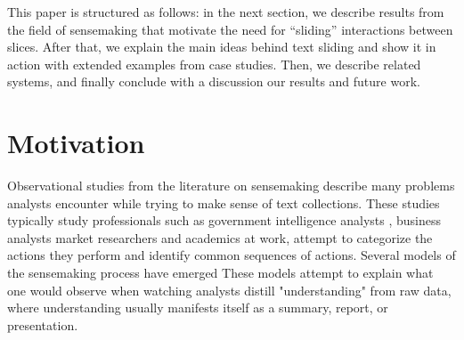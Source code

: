 \documentclass{sig-alternate}
\begin{document}
This paper is structured as follows: in the next section, we describe results from the field of sensemaking that motivate the need for ``sliding'' interactions between slices. After that, we explain the main ideas behind text sliding and show it in action with extended examples from case studies. Then, we describe related systems, and finally conclude with a discussion our results and future work.

\section{Motivation}
Observational studies from the literature on sensemaking describe many problems analysts encounter while trying to make sense of text collections. These studies typically study professionals such as government intelligence analysts \cite{x}, business analysts \cite{x} market researchers \cite{x} and academics \cite{x} at work, attempt to categorize the actions they perform and identify common sequences of actions. Several models of the sensemaking process have emerged \cite{x} These models attempt to explain what one would observe when watching analysts distill "understanding" from raw data, where understanding usually manifests itself as a summary, report, or presentation.
\end{document}

